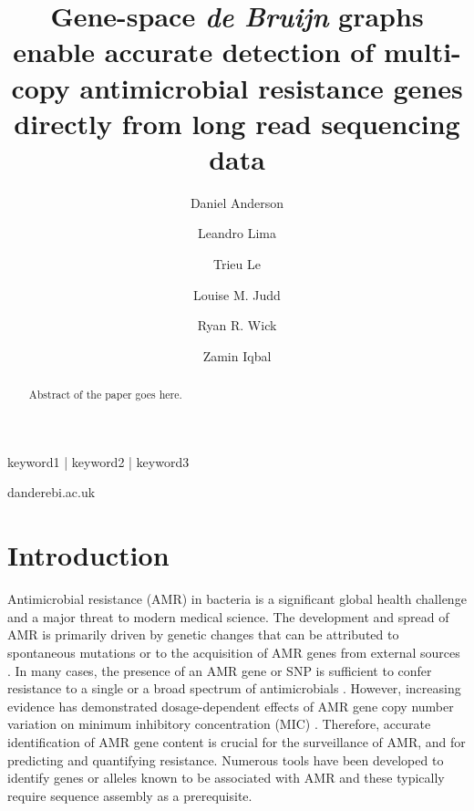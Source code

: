 
\title{Gene-space \textit{de Bruijn} graphs enable accurate detection of multi-copy antimicrobial resistance genes directly from long read sequencing data}
\shorttitle{}

\author[1, \Letter]{Daniel Anderson }
\author[1]{Leandro Lima }
\author[2]{Trieu Le }
\author[3]{Louise M. Judd }
\author[3]{Ryan R. Wick }
\author[1,2]{Zamin Iqbal }

\date{}

\maketitle

\begin{abstract}
Abstract of the paper goes here.
\end{abstract}

\begin{keywords}
keyword1 | keyword2 | keyword3
\end{keywords}

\begin{corrauthor}
dander\at ebi.ac.uk
\end{corrauthor}

\section*{Introduction}

Antimicrobial resistance (AMR) in bacteria is a significant global health challenge and a major threat to modern medical science. The development and spread of AMR is primarily driven by genetic changes that can be attributed to spontaneous mutations or to the acquisition of AMR genes from external sources \cite{10.1038/s41576-019-0108-4}. In many cases, the presence of an AMR gene or SNP is sufficient to confer resistance to a single or a broad spectrum of antimicrobials \cite{10.1128/AEM.02873-15}. However, increasing evidence has demonstrated dosage-dependent effects of AMR gene copy number variation on minimum inhibitory concentration (MIC) \cite{10.1128/aac.02026-19, 10.1128/AAC.46.10.3334-3336.2002}. Therefore, accurate identification of AMR gene content is crucial for the surveillance of AMR, and for predicting and quantifying resistance. Numerous tools have been developed to identify genes or alleles known to be associated with AMR \cite{Feldgarden2021, Bortolaia2020, 10.1093.nar.gkz935, Seemann2023, Hunt2017, Bradley2015} and these typically require sequence assembly as a prerequisite. 

